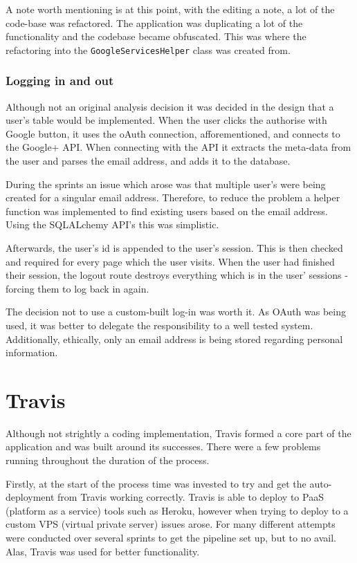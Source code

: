 A note worth mentioning is at this point, with the editing a note, a lot of the code-base was refactored. The application was duplicating a lot of the functionality and the codebase became obfuscated. This was where the refactoring into the \texttt{GoogleServicesHelper} class was created from.

\subsubsection{Logging in and out}
Although not an original analysis decision it was decided in the design that a user's table would be implemented. When the user clicks the authorise with Google button, it uses the oAuth connection, afforementioned, and connects to the Google+ API. When connecting with the API it extracts the meta-data from the user and parses the email address, and adds it to the database.

During the sprints an issue which arose was that multiple user's were being created for a singular email address. Therefore, to reduce the problem a helper function was implemented to find existing users based on the email address. Using the SQLALchemy API's this was simplistic.

Afterwards, the user's id is appended to the user's session. This is then checked and required for every page which the user visits. When the user had finished their session, the logout route destroys everything which is in the user' sessions - forcing them to log back in again.

The decision not to use a custom-built log-in was worth it. As OAuth was being used, it was better to delegate the responsibility to a well tested system. Additionally, ethically, only an email address is being stored regarding personal information.

\section{Travis}
Although not strightly a coding implementation, Travis formed a core part of the application and was built around its successes. There were a few problems running throughout the duration of the process.

Firstly, at the start of the process time was invested to try and get the auto-deployment from Travis working correctly. Travis is able to deploy to PaaS (platform as a service) tools such as Heroku, however when trying to deploy to a custom VPS (virtual private server) issues arose. For many different attempts were conducted over several sprints to get the pipeline set up, but to no avail. Alas, Travis was used for better functionality.

